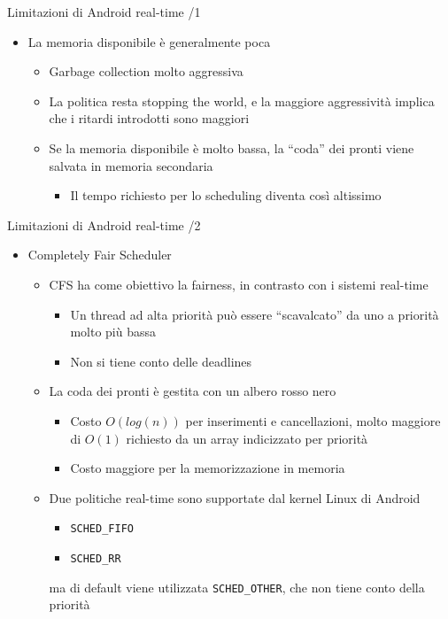 \begin{frame}{Limitazioni di Android real-time /1}
	\begin{itemize}
		\item La memoria disponibile è generalmente poca
		\begin{itemize}
			\item Garbage collection molto aggressiva
			\item La politica resta stopping the world, e la maggiore aggressività implica che i ritardi introdotti sono maggiori
			\item Se la memoria disponibile è molto bassa, la ``coda'' dei pronti viene salvata in memoria secondaria
			\begin{itemize}
				\item Il tempo richiesto per lo scheduling diventa così altissimo
			\end{itemize}
		\end{itemize}
	\end{itemize}
\end{frame}
\begin{frame}{Limitazioni di Android real-time /2}
	\begin{itemize}
		\item Completely Fair Scheduler
		\begin{itemize}
			\item CFS ha come obiettivo la fairness, in contrasto con i sistemi real-time
			\begin{itemize}
				\item Un thread ad alta priorità può essere ``scavalcato'' da uno a priorità molto più bassa
				\item Non si tiene conto delle deadlines
			\end{itemize}
			\item La coda dei pronti è gestita con un albero rosso nero
			\begin{itemize}
				\item Costo $O(log(n))$ per inserimenti e cancellazioni, molto maggiore di $O(1)$ richiesto da un array indicizzato per priorità
				\item Costo maggiore per la memorizzazione in memoria
			\end{itemize}
			\item Due politiche real-time sono supportate dal kernel Linux di Android
			\begin{itemize}
				\item \texttt{SCHED\_FIFO}
				\item \texttt{SCHED\_RR}
			\end{itemize}
			ma di default viene utilizzata \texttt{SCHED\_OTHER}, che non tiene conto della priorità
		\end{itemize}
	\end{itemize}
\end{frame}
